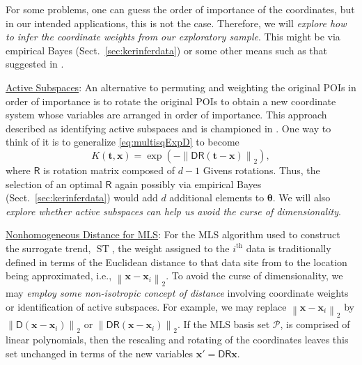 \documentclass[11pt]{NSFamsart}
\newcommand{\Upara}[1]{\noindent\underline{\upshape #1}:}
\DeclareMathOperator{\STREND}{ST} %
\newcommand{\mD}{\mathsf{D}}
\newcommand{\mR}{\mathsf{R}}
\newcommand{\bx}{{\boldsymbol{x}}}
\newcommand{\bt}{{\boldsymbol{t}}}
\newcommand{\btheta}{{\boldsymbol{\theta}}}
\newcommand{\calp}{{\mathcal{P}}}
\newcommand{\norm}[2][{}]{\ensuremath{\left \lVert #2 \right \rVert}_{#1}}
\begin{document}
For some problems, one can guess the order of importance of the coordinates, but in our intended applications, this is not the case. Therefore, we will \emph{explore how to infer the coordinate weights from our exploratory sample}. This might be via empirical Bayes (Sect.\ \ref{sec:kerinferdata}) or some other means such as that suggested in \cite{DinHic20a}.

\Upara{Active Subspaces}
An alternative to permuting and weighting the original POIs in order of importance is to rotate the original POIs to obtain a new coordinate system whose variables are arranged in order of importance. This approach described as identifying active subspaces and is championed in \cite{constantine2015active}. One way to think of it is to generalize \eqref{eq:multisqExpD} to become 
\begin{equation} \label{eq:multisqExpD}
	K(\bt,\bx) = \exp(-\norm[2]{\mD \mR(\bt-\bx)}), 
\end{equation}
where $\mR$ is rotation matrix composed of $d-1$ Givens rotations.  Thus, the selection of an optimal $\mR$ again possibly via empirical Bayes (Sect.\ \ref{sec:kerinferdata}) would add $d$ additional elements to $\btheta$.  
We will also \emph{explore whether active subspaces can help us avoid the curse of dimensionality}.

\Upara{Nonhomogeneous Distance for MLS}
For the MLS algorithm used to construct the surrogate trend, $\STREND$, the weight assigned to the $i^{\text{th}}$ data is traditionally defined in terms of the Euclidean distance to that data site from to the location being approximated, i.e., $\norm[2]{\bx - \bx_i}$. To avoid the curse of dimensionality, we may \emph{employ some non-isotropic concept of distance} involving coordinate weights or identification of active subspaces.  For example, we may replace $\norm[2]{\bx - \bx_i}$ by $\norm[2]{\mD(\bx-\bx_i)}$ or $\norm[2]{\mD \mR(\bx - \bx_i)}$.  If the MLS basis set $\calp$, is comprised of linear polynomials, then the rescaling and rotating of the coordinates leaves this set unchanged in terms of the new variables $\bx' =  \mD \mR \bx$.


\end{document}
